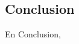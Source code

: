 \documentclass[utf8]{article}
\begin{document}
\begin{large}
\section{Conclusion}
\indent
\par
En Conclusion,
\par

\end{large}
\end{document}
